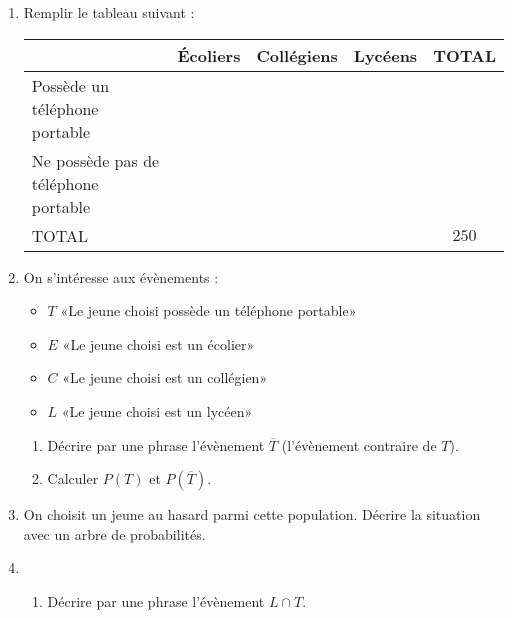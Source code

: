 \documentclass[
	classe=$2^{de}$
]{exercice}
\begin{document}
\begin{enumerate}
	\item Remplir le tableau suivant :
	      \begin{center}
		      \begin{tabular}{|l|c|c|c|c|}
			      \hline
			                                           & Écoliers           & Collégiens        & Lycéens           & TOTAL              \\ \hline
			      Possède un téléphone portable        & \correction{$33$}  & \correction{$76$} & \correction{$38$} & \correction{$147$} \\ \hline
			      Ne possède pas de téléphone portable & \correction{$87$}  & \correction{$14$} & \correction{$2$}  & \correction{$103$} \\ \hline
			      TOTAL                                & \correction{$120$} & \correction{$90$} & \correction{$40$} & $250$              \\ \hline
		      \end{tabular}
	      \end{center}
	\item On s'intéresse aux évènements :
	      \begin{itemize}
		      \item $T$ «Le jeune choisi possède un téléphone portable»
		      \item $E$ «Le jeune choisi est un écolier»
		      \item $C$ «Le jeune choisi est un collégien»
		      \item $L$ «Le jeune choisi est un lycéen»
	      \end{itemize}
	      \begin{enumerate}
		      \item Décrire par une phrase l'évènement $\overline{T}$ (l'évènement contraire de $T$). \medskip

		      \item Calculer $P(T)$ et $P(\overline{T})$. \medskip

	      \end{enumerate}
	\item On choisit un jeune au hasard parmi cette population. Décrire la situation avec un arbre de probabilités.
	\item \begin{enumerate}
		      \item Décrire par une phrase l'évènement $L ∩ T$. \medskip


\end{enumerate}
\end{enumerate}
\end{document}
